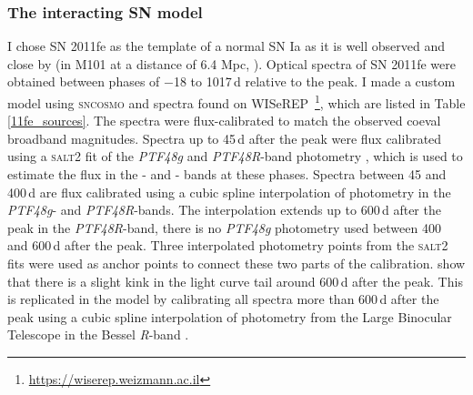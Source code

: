 \documentclass[a4paper,oneside,12pt, class=Latex/Classes/PhDthesisPSnPDF, crop=false]{standalone}
\begin{document}
\subsubsection{The interacting SN model}
\label{model_description}
I chose SN 2011fe as the template of a normal SN Ia as it is well observed and close by (in M101 at a distance of 6.4 Mpc, \citealt{M101_cep_dist}). Optical spectra of SN 2011fe were obtained between phases of $-$18 to 1017\,d relative to the peak. I made a custom model using \textsc{sncosmo} and spectra found on WISeREP \citep{wiserep}\,\footnote{\url{https://wiserep.weizmann.ac.il}}, which are listed in Table \ref{11fe_sources}. The spectra were flux-calibrated to match the observed coeval broadband magnitudes. Spectra up to 45\,d after the peak were flux calibrated using a \textsc{salt2} \citep{salt2} fit of the \textit{PTF48g} and \textit{PTF48R}-band photometry \citep{PTF_1, PTF_2}, which is used to estimate the flux in the \ztfg- and \ztfr- bands at these phases. Spectra between 45 and 400\,d are flux calibrated using a cubic spline interpolation of photometry in the \textit{PTF48g}- and \textit{PTF48R}-bands. The interpolation extends up to 600\,d after the peak in the \textit{PTF48R}-band, there is no \textit{PTF48g} photometry used between 400 and 600\,d after the peak. Three interpolated photometry points from the \textsc{salt2} fits were used as anchor points to connect these two parts of the calibration. \citet{Georgios_11fe} show that there is a slight kink in the light curve tail around 600\,d after the peak. This is replicated in the model by calibrating all spectra more than 600\,d after the peak using a cubic spline interpolation of photometry from the Large Binocular Telescope \citep[LBT;][]{LBT} in the Bessel \textit{R}-band \citep{Shappee_11fe}.
\end{document}
